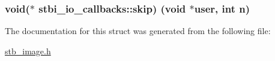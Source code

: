 \subsubsection[{\texorpdfstring{skip}{skip}}]{\setlength{\rightskip}{0pt plus 5cm}void($\ast$ stbi\+\_\+io\+\_\+callbacks\+::skip) (void $\ast$user, int n)}\hypertarget{structstbi__io__callbacks_a257aac5480a90a6c4b8fbe86c1b01068}{}\label{structstbi__io__callbacks_a257aac5480a90a6c4b8fbe86c1b01068}


The documentation for this struct was generated from the following file\+:\begin{DoxyCompactItemize}
\item 
\hyperlink{stb__image_8h}{stb\+\_\+image.\+h}\end{DoxyCompactItemize}
